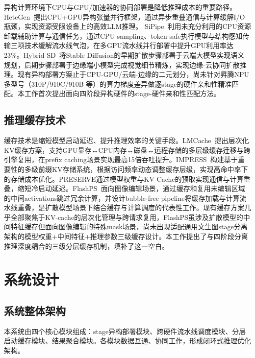\documentclass{ctexart}
\begin{document}
异构计算环境下CPU与GPU/加速器的协同部署是降低推理成本的重要路径。HeteGen~\cite{HeteGenHeterogeneousParallelZhao2024}提出CPU+GPU异构张量并行框架，通过异步重叠通信与计算缓解I/O瓶颈，实现资源受限设备上的高效LLM推理。
SiPipe~\cite{SiPipeBridgingCPUGPUHe2025}利用未充分利用的CPU资源卸载辅助计算与通信任务，通过CPU sampling、token-safe执行模型与结构感知传输三项技术缓解流水线气泡，在多GPU流水线并行部署中提升GPU利用率达23\%。Hybrid SD~\cite{HybridSDEdgeCloudYan2024}将Stable Diffusion的早期扩散步骤部署于云端大模型实现语义规划，后期步骤部署于边缘端小模型完成视觉细节精炼，实现边缘-云协同扩散推理。现有异构部署方案止于CPU-GPU/云端-边缘的二元划分，尚未针对昇腾NPU多型号（310P/910C/910B 等）的算力梯度差异做逐stage的硬件亲和性精准匹配。本工作首次提出面向四阶段异构硬件的stage-硬件亲和性匹配方法。

\subsection{推理缓存技术}

缓存技术是缩短模型启动延迟、提升推理效率的关键手段。LMCache~\cite{LMCacheEfficientKVLiu2025}提出层次化KV缓存方案，支持GPU显存↔CPU内存↔磁盘↔远程存储的多层级缓存迁移与跨引擎复用，在prefix caching场景实现最高15倍吞吐提升。IMPRESS~\cite{IMPRESSImportanceInformedMultiTierChen2025}构建基于重要性的多级前缀KV存储系统，根据访问频率动态调整缓存层级，实现高命中率下的存储成本优化。PRESERVE通过模型权重与KV Cache的预取实现通信与计算重叠，缩短冷启动延迟。FlashPS~\cite{FlashPSEfficientGenerativeJiang2026}面向图像编辑场景，通过缓存和复用未编辑区域的中间activations跳过冗余计算，并设计bubble-free pipeline将缓存加载与计算流水线重叠，是扩散模型场景下结合缓存与计算调度的代表性工作。现有缓存方案几乎全部聚焦于KV-cache的层次化管理与跨请求复用，FlashPS虽涉及扩散模型的中间特征缓存但面向图像编辑的特殊mask场景，尚未出现适配通用文生图stage分离架构的模型权重+中间特征+推理参数三级缓存设计。本工作提出了与四阶段分离推理深度耦合的三级分层缓存机制，填补了这一空白。

\section{系统设计}

\subsection{系统整体架构}

本系统由四个核心模块组成：stage异构部署模块、跨硬件流水线调度模块、分层启动缓存模块、结果聚合模块。各模块数据互通、协同工作，形成闭环式推理优化架构。
\end{document}
